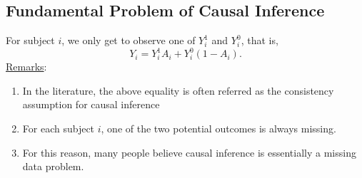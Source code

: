 \subsection*{Fundamental Problem of Causal Inference}
\begin{Regular}{}
    For subject $ i $, we only get to observe one of $ Y_i^1 $ and $ Y_i^0 $, that is,
    \[ Y_i=Y_i^1A_i+Y_i^0(1-A_i). \]
    \tcblower{}
    \underline{Remarks}:
    \begin{enumerate}[(1)]
        \item In the literature, the above equality is often referred as the
              consistency assumption for causal inference
        \item For each subject $i$, one of the two potential outcomes is
              always missing.
        \item For this reason, many people believe causal inference is
              essentially a missing data problem.
    \end{enumerate}
\end{Regular}
